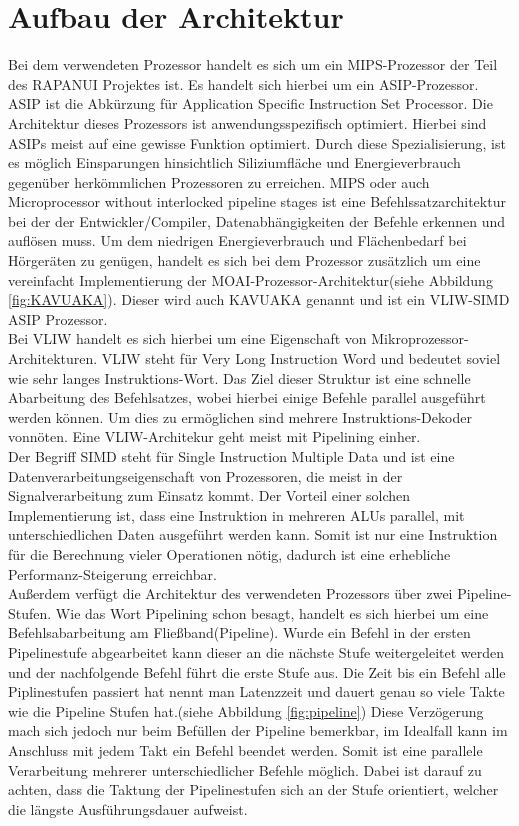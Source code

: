 \section{Aufbau der Architektur}
\label{chap:architecture_overview}
Bei dem verwendeten Prozessor handelt es sich um ein MIPS-Prozessor der Teil des RAPANUI Projektes ist. Es handelt sich hierbei um ein ASIP-Prozessor. ASIP ist die Abkürzung für Application Specific Instruction Set Processor. Die Architektur dieses Prozessors ist anwendungsspezifisch optimiert. Hierbei sind ASIPs meist auf eine gewisse Funktion optimiert. Durch diese Spezialisierung, ist es möglich Einsparungen hinsichtlich Siliziumfläche und Energieverbrauch gegenüber herkömmlichen Prozessoren zu erreichen. MIPS oder auch \glqq Microprocessor without interlocked pipeline stages\grqq{} ist eine Befehlssatzarchitektur bei der der Entwickler/Compiler, Datenabhängigkeiten der Befehle erkennen und auflösen muss.
Um dem niedrigen Energieverbrauch und Flächenbedarf bei Hörgeräten zu genügen, handelt es sich bei dem Prozessor zusätzlich um eine vereinfacht Implementierung der MOAI-Prozessor-Architektur(siehe Abbildung \ref{fig:KAVUAKA}). Dieser wird auch KAVUAKA genannt und ist ein VLIW-SIMD ASIP Prozessor.\\
Bei VLIW  handelt es sich hierbei um eine Eigenschaft von Mikroprozessor-Architekturen. VLIW steht für Very Long Instruction Word und bedeutet soviel wie sehr langes Instruktions-Wort. Das Ziel dieser Struktur ist eine schnelle Abarbeitung des Befehlsatzes, wobei hierbei einige Befehle parallel ausgeführt werden können. Um dies zu ermöglichen sind mehrere Instruktions-Dekoder vonnöten. Eine VLIW-Architekur geht meist mit Pipelining einher.\\
Der Begriff SIMD steht für Single Instruction Multiple Data und ist eine Datenverarbeitungseigenschaft von Prozessoren, die meist in der Signalverarbeitung zum Einsatz kommt. Der Vorteil einer solchen Implementierung ist, dass eine Instruktion in mehreren ALUs parallel, mit unterschiedlichen Daten ausgeführt werden kann. Somit ist nur eine Instruktion für die Berechnung vieler Operationen nötig, dadurch ist eine erhebliche Performanz-Steigerung erreichbar.\cite[Seite 249]{wust2010mikroprozessortechnik}\\
Außerdem verfügt die Architektur des verwendeten Prozessors über zwei Pipeline-Stufen.
Wie das Wort Pipelining schon besagt, handelt es sich hierbei um eine Befehlsabarbeitung am Fließband(Pipeline). Wurde ein Befehl in der ersten Pipelinestufe abgearbeitet kann dieser an die nächste Stufe weitergeleitet werden und der nachfolgende Befehl führt die erste Stufe aus. Die Zeit bis ein Befehl alle Piplinestufen passiert hat nennt man Latenzzeit und dauert genau so viele Takte wie die Pipeline Stufen hat.(siehe Abbildung \ref{fig:pipeline}) Diese Verzögerung mach sich jedoch nur beim Befüllen der Pipeline bemerkbar, im Idealfall kann im Anschluss mit jedem Takt ein Befehl beendet werden. Somit ist eine parallele Verarbeitung mehrerer unterschiedlicher Befehle möglich. Dabei ist darauf zu achten, dass die Taktung der Pipelinestufen sich an der Stufe orientiert, welcher die längste Ausführungsdauer aufweist. \cite[Seite 204]{wust2010mikroprozessortechnik}
